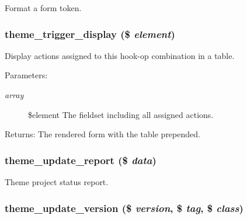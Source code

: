 Format a form token. \hypertarget{group__themeable_g291ceb7284cc7baf7dcf551a9cedec24}{
\subsubsection[{theme\_\-trigger\_\-display}]{\setlength{\rightskip}{0pt plus 5cm}theme\_\-trigger\_\-display (\$ {\em element})}}
\label{group__themeable_g291ceb7284cc7baf7dcf551a9cedec24}


Display actions assigned to this hook-op combination in a table.

\begin{Desc}
\item[Parameters:]
\begin{description}
\item[{\em array}]\$element The fieldset including all assigned actions. \end{description}
\end{Desc}
\begin{Desc}
\item[Returns:]The rendered form with the table prepended. \end{Desc}
\hypertarget{group__themeable_gc4985959e9c84378884ce60282b6eca2}{
\subsubsection[{theme\_\-update\_\-report}]{\setlength{\rightskip}{0pt plus 5cm}theme\_\-update\_\-report (\$ {\em data})}}
\label{group__themeable_gc4985959e9c84378884ce60282b6eca2}


Theme project status report. \hypertarget{group__themeable_g24a724467a0b23d3672b3a253be3695f}{
\subsubsection[{theme\_\-update\_\-version}]{\setlength{\rightskip}{0pt plus 5cm}theme\_\-update\_\-version (\$ {\em version}, \/  \$ {\em tag}, \/  \$ {\em class})}}
\label{group__themeable_g24a724467a0b23d3672b3a253be3695f}


